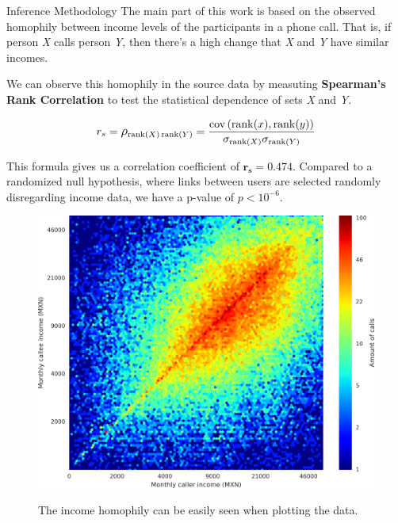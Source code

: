 \documentclass{beamer}
\begin{document}
\begin{frame}{Inference Methodology}
The main part of this work is based on the observed homophily between income levels of the participants in a phone call. That is, if person \emph{X} calls person \emph{Y}, then there's a high change that \emph{X} and \emph{Y} have similar incomes.
	
We can observe this homophily in the source data by measuting \textbf{Spearman's Rank Correlation} to test the statistical dependence of sets \emph{X} and \emph{Y}.

\[
	r_s = \mathlarger{\rho}_{\operatorname{rank}(X) \operatorname{rank}(Y)} = \frac{\operatorname{cov} \left( \operatorname{rank}(x), \operatorname{rank}(y) \right)}{\sigma_{\operatorname{rank}(X)} \sigma_{\operatorname{rank}(Y)}}
\]

This formula gives us a correlation coefficient of \( \mathbf{r_s = 0.474} \). Compared to a randomized null hypothesis, where links between users are selected randomly disregarding income data, we have a p-value of \( p < 10^{-6} \).

\end{frame}
\begin{frame}

\begin{figure}[h]
	\begin{center}
		{\includegraphics[height=0.8\textheight]
		{figures/Homophily_income_origin_target_1/Homophily_income_origin_target_1.png}
		}\label{homophily_heatmap}
	\end{center}
	\caption{The income homophily can be easily seen when plotting the data.}
\end{figure}

\end{frame}
\end{document}
